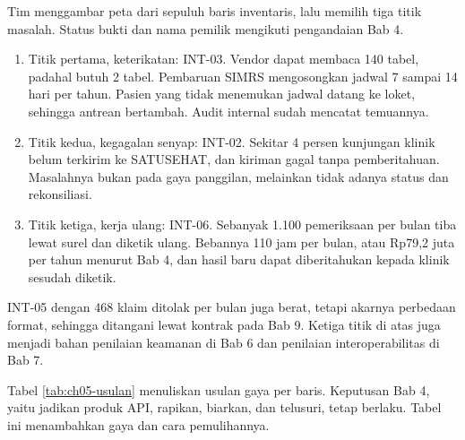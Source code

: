 \begin{kasus}[title={Kasus Medikara Health: Peta Integrasi dan Tiga Titik Masalah}]
Tim menggambar peta dari sepuluh baris inventaris, lalu memilih tiga titik masalah. Status bukti dan nama pemilik mengikuti pengandaian Bab 4.
\begin{enumerate}
  \item Titik pertama, keterikatan: INT-03. Vendor dapat membaca 140 tabel, padahal butuh 2 tabel. Pembaruan SIMRS mengosongkan jadwal 7 sampai
        14 hari per tahun. Pasien yang tidak menemukan jadwal datang ke loket, sehingga antrean bertambah. Audit internal sudah mencatat temuannya.
  \item Titik kedua, kegagalan senyap: INT-02. Sekitar 4 persen kunjungan klinik belum terkirim ke SATUSEHAT, dan kiriman gagal tanpa
        pemberitahuan. Masalahnya bukan pada gaya panggilan, melainkan tidak adanya status dan rekonsiliasi.
  \item Titik ketiga, kerja ulang: INT-06. Sebanyak 1.100 pemeriksaan per bulan tiba lewat surel dan diketik ulang. Bebannya 110 jam per bulan, atau
        Rp79,2 juta per tahun menurut Bab 4, dan hasil baru dapat diberitahukan kepada klinik sesudah diketik.
\end{enumerate}

INT-05 dengan 468 klaim ditolak per bulan juga berat, tetapi akarnya perbedaan format, sehingga ditangani lewat kontrak pada Bab 9. Ketiga titik
di atas juga menjadi bahan penilaian keamanan di Bab 6 dan penilaian interoperabilitas di Bab 7.
\end{kasus}

Tabel \ref{tab:ch05-usulan} menuliskan usulan gaya per baris. Keputusan Bab 4, yaitu jadikan produk API, rapikan, biarkan, dan telusuri, tetap
berlaku. Tabel ini menambahkan gaya dan cara pemulihannya.

